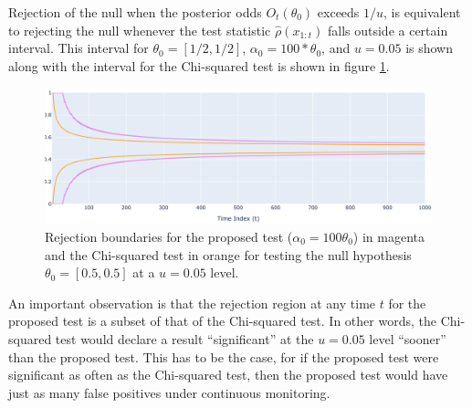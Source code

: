 \documentclass[11pt]{article}
\begin{document}
  Rejection of the null when the posterior odds $O_t(\theta_0)$ exceeds $1/u$, is equivalent to rejecting the null whenever the test statistic $\hat{\rho}(x_{1:t})$ falls outside a certain interval. This interval for $\theta_0 = [1/2,1/2]$, $\alpha_0 = 100*\theta_0 $, and $u=0.05$ is shown along with the interval for the Chi-squared test is shown in figure \ref{fig:critical}.
\begin{figure}[H]
  \centering
  \includegraphics[scale=0.35]{images/critical_regions.png}
  \caption{Rejection boundaries for the proposed test ($\alpha_0 = 100\theta_0$) in magenta and the Chi-squared test in orange for testing the null hypothesis $\theta_0 = [0.5, 0.5]$ at a $u=0.05$ level. }
    \label{fig:critical}
  \end{figure}
  An important observation is that the rejection region at any time $t$ for the proposed test is a subset of that of the Chi-squared test. In other words, the Chi-squared test would declare a result ``significant'' at the $u=0.05$ level ``sooner'' than the proposed test. This has to be the case, for if the proposed test were significant as often as the Chi-squared test, then the proposed test would have just as many false positives under continuous monitoring.
  
\end{document}
